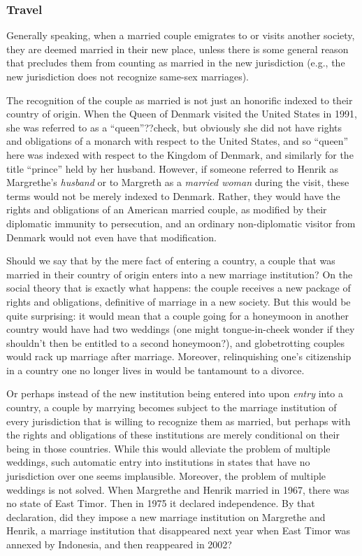 \subsubsection{Travel}
Generally speaking, when a married couple emigrates to or visits another society, they are deemed married in their new place, unless there is some general reason that precludes them from counting as married in the new jurisdiction
(e.g., the new jurisdiction does not recognize same-sex marriages).

The recognition of the couple as married is not just an honorific indexed to their country of origin. When the Queen of Denmark visited the United States in 1991,
she was referred to as a ``queen''??check, but obviously she did not have rights and obligations of a monarch with respect to the United States, and so ``queen''
here was indexed with respect to the Kingdom of Denmark, and similarly for the title ``prince'' held by her husband. However, if someone referred to Henrik
as Margrethe's \textit{husband} or to Margreth as a \textit{married woman} during the visit, these terms would not be merely indexed to Denmark. Rather, they would
have the rights and obligations of an American married couple, as modified by their diplomatic immunity to persecution, and an ordinary non-diplomatic visitor from
Denmark would not even have that modification.

Should we say that by the mere fact of entering a country, a couple that was married in their country of origin enters into a new marriage institution?
On the social theory that is exactly what happens: the couple receives a new package of rights and obligations, definitive of marriage in a new society.
But this would be quite surprising: it would mean that a couple going for a honeymoon in another country would have had two weddings (one might tongue-in-cheek wonder if
they shouldn't then be entitled to a second honeymoon?), and globetrotting couples would rack up marriage after marriage. Moreover, relinquishing one's
citizenship in a country one no longer lives in would be tantamount to a divorce.

Or perhaps instead of the new institution being entered into upon \textit{entry} into a country, a couple by marrying becomes subject to the marriage institution of every
jurisdiction that is willing to recognize them as married, but perhaps with the rights and obligations of these institutions are merely conditional on their being in
those countries. While this would alleviate the problem of multiple weddings, such automatic entry into institutions in states that have no jurisdiction over one seems implausible.
Moreover, the problem of multiple weddings is not solved. When Margrethe and Henrik married in 1967, there was no state of East Timor. Then in
1975 it declared independence. By that declaration, did they impose a new marriage institution on Margrethe and Henrik, a marriage institution that disappeared
next year when East Timor was annexed by Indonesia, and then reappeared in 2002?

